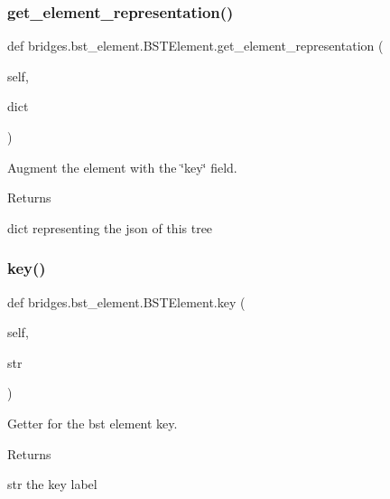 \subsubsection{\texorpdfstring{get\+\_\+element\+\_\+representation()}{get\_element\_representation()}}
{\footnotesize\ttfamily def bridges.\+bst\+\_\+element.\+B\+S\+T\+Element.\+get\+\_\+element\+\_\+representation (\begin{DoxyParamCaption}\item[{}]{self,  }\item[{}]{dict }\end{DoxyParamCaption})}



Augment the element with the \char`\"{}key\char`\"{} field. 

\begin{DoxyReturn}{Returns}


dict representing the json of this tree 
\end{DoxyReturn}
\mbox{\label{classbridges_1_1bst__element_1_1_b_s_t_element_ab8fc663b1168808f83ab157e66c793d9}} 
\subsubsection{\texorpdfstring{key()}{key()}\hspace{0.1cm}{\footnotesize\ttfamily [1/2]}}
{\footnotesize\ttfamily def bridges.\+bst\+\_\+element.\+B\+S\+T\+Element.\+key (\begin{DoxyParamCaption}\item[{}]{self,  }\item[{}]{str }\end{DoxyParamCaption})}



Getter for the bst element key. 

\begin{DoxyReturn}{Returns}


str the key label 
\end{DoxyReturn}
\mbox{\label{classbridges_1_1bst__element_1_1_b_s_t_element_a46236bc9db305c61429a56f7ed74df64}} 

